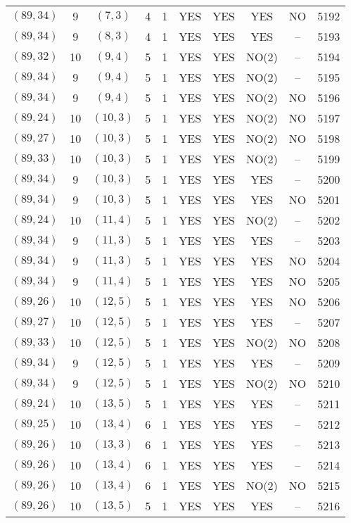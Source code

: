\begin{longtable}{|c|c|c|c|c|c|c|c|c|c|}
$(89, 34)$ & 9 & $(7, 3)$ & 4 & 1 & YES & YES & YES & NO & 5192\\
$(89, 34)$ & 9 & $(8, 3)$ & 4 & 1 & YES & YES & YES & -- & 5193\\
$(89, 32)$ & 10 & $(9, 4)$ & 5 & 1 & YES & YES & NO(2) & -- & 5194\\
$(89, 34)$ & 9 & $(9, 4)$ & 5 & 1 & YES & YES & NO(2) & -- & 5195\\
$(89, 34)$ & 9 & $(9, 4)$ & 5 & 1 & YES & YES & NO(2) & NO & 5196\\
$(89, 24)$ & 10 & $(10, 3)$ & 5 & 1 & YES & YES & NO(2) & NO & 5197\\
$(89, 27)$ & 10 & $(10, 3)$ & 5 & 1 & YES & YES & NO(2) & NO & 5198\\
$(89, 33)$ & 10 & $(10, 3)$ & 5 & 1 & YES & YES & NO(2) & -- & 5199\\
$(89, 34)$ & 9 & $(10, 3)$ & 5 & 1 & YES & YES & YES & -- & 5200\\
$(89, 34)$ & 9 & $(10, 3)$ & 5 & 1 & YES & YES & YES & NO & 5201\\
$(89, 24)$ & 10 & $(11, 4)$ & 5 & 1 & YES & YES & NO(2) & -- & 5202\\
$(89, 34)$ & 9 & $(11, 3)$ & 5 & 1 & YES & YES & YES & -- & 5203\\
$(89, 34)$ & 9 & $(11, 3)$ & 5 & 1 & YES & YES & YES & NO & 5204\\
$(89, 34)$ & 9 & $(11, 4)$ & 5 & 1 & YES & YES & YES & NO & 5205\\
$(89, 26)$ & 10 & $(12, 5)$ & 5 & 1 & YES & YES & YES & NO & 5206\\
$(89, 27)$ & 10 & $(12, 5)$ & 5 & 1 & YES & YES & YES & -- & 5207\\
$(89, 33)$ & 10 & $(12, 5)$ & 5 & 1 & YES & YES & NO(2) & NO & 5208\\
$(89, 34)$ & 9 & $(12, 5)$ & 5 & 1 & YES & YES & YES & -- & 5209\\
$(89, 34)$ & 9 & $(12, 5)$ & 5 & 1 & YES & YES & NO(2) & NO & 5210\\
$(89, 24)$ & 10 & $(13, 5)$ & 5 & 1 & YES & YES & YES & -- & 5211\\
$(89, 25)$ & 10 & $(13, 4)$ & 6 & 1 & YES & YES & YES & -- & 5212\\
$(89, 26)$ & 10 & $(13, 3)$ & 6 & 1 & YES & YES & YES & -- & 5213\\
$(89, 26)$ & 10 & $(13, 4)$ & 6 & 1 & YES & YES & YES & -- & 5214\\
$(89, 26)$ & 10 & $(13, 4)$ & 6 & 1 & YES & YES & NO(2) & NO & 5215\\
$(89, 26)$ & 10 & $(13, 5)$ & 5 & 1 & YES & YES & YES & -- & 5216\\

\end{longtable}
